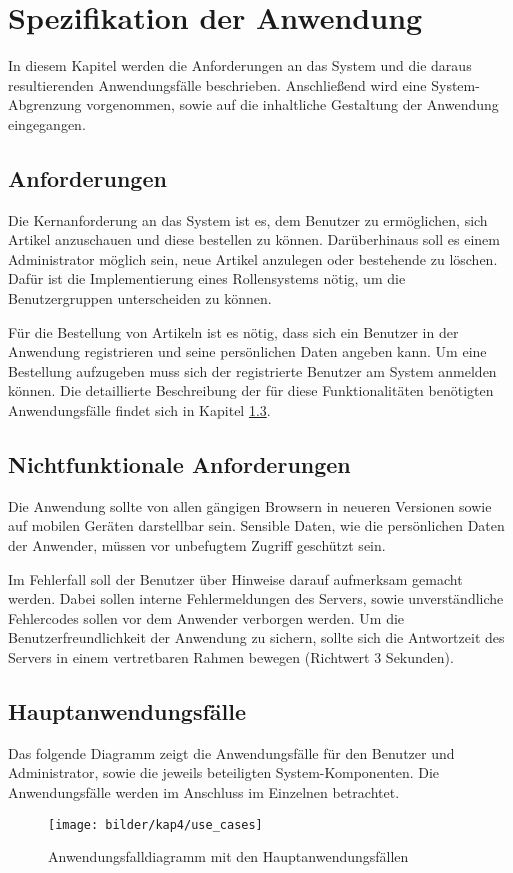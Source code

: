 \section{Spezifikation der Anwendung}\label{specification} \thispagestyle{nomarkstyle}
In diesem Kapitel werden die Anforderungen an das System und die daraus resultierenden Anwendungsfälle beschrieben.
Anschließend wird eine System-Abgrenzung vorgenommen, sowie auf die inhaltliche Gestaltung der Anwendung eingegangen.

\subsection{Anforderungen}
Die Kernanforderung an das System ist es, dem Benutzer zu ermöglichen, sich Artikel anzuschauen und diese bestellen zu können.
Darüberhinaus soll es einem Administrator möglich sein, neue Artikel anzulegen oder bestehende zu löschen.
Dafür ist die Implementierung eines Rollensystems nötig, um die Benutzergruppen unterscheiden zu können.

Für die Bestellung von Artikeln ist es nötig, dass sich ein Benutzer in der Anwendung registrieren und seine persönlichen Daten angeben kann.
Um eine Bestellung aufzugeben muss sich der registrierte Benutzer am System anmelden können.
Die detaillierte Beschreibung der für diese Funktionalitäten benötigten Anwendungsfälle findet sich in Kapitel \ref{usecases}.
\subsection{Nichtfunktionale Anforderungen}
Die Anwendung sollte von allen gängigen Browsern in neueren Versionen sowie auf mobilen Geräten darstellbar sein.
Sensible Daten, wie die persönlichen Daten der Anwender, müssen vor unbefugtem Zugriff geschützt sein.

Im Fehlerfall soll der Benutzer über Hinweise darauf aufmerksam gemacht werden.
Dabei sollen interne Fehlermeldungen des Servers, sowie unverständliche Fehlercodes sollen vor dem Anwender verborgen werden.
Um die Benutzerfreundlichkeit der Anwendung zu sichern, sollte sich die Antwortzeit des Servers in einem vertretbaren Rahmen bewegen (Richtwert 3 Sekunden).
\subsection{Hauptanwendungsfälle}\label{usecases}
Das folgende Diagramm zeigt die Anwendungsfälle für den Benutzer und Administrator, sowie die jeweils beteiligten System-Komponenten.
Die Anwendungsfälle werden im Anschluss im Einzelnen betrachtet.
\begin{figure}[ht!]
	\centering
	\texttt{[image: bilder/kap4/use\_cases]}
	\caption{Anwendungsfalldiagramm mit den Hauptanwendungsfällen}
	\label{fig:usecases}
\end{figure}

